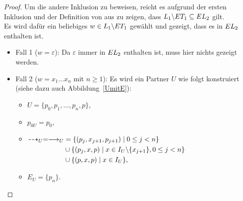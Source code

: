 \begin{proof}
  Um die andere Inklusion zu beweisen, reicht es aufgrund der ersten
  Inklusion und der Definition von \EL{} aus zu zeigen, dass $L_1\backslash ET
  _1\subseteq EL _2$ gilt.\\
  Es wird dafür ein beliebiges $w\in L_1\backslash ET _1$ gewählt und gezeigt,
  dass es in $EL _2$ enthalten ist.
  \begin{itemize}
    \item Fall 1 ($w=\varepsilon$): Da $\varepsilon$ immer in $EL _2$
      enthalten ist, muss hier nichts gezeigt werden.
    \item Fall 2 ($w=x_1\dots x_n$ mit $n\geq 1$): Es wird ein Partner $U$ wie
      folgt konstruiert (siehe dazu auch Abbildung~\ref{UmitE}):
      \begin{itemize}
        \item $U=\{p_0,p_1,\dots ,p_n,p\}$,
        \item $p_{0U}=p_0$,
        \item $\begin{aligned}[t]
            \may _U = \must _U&=\{(p_j,x_{j+1},p_{j+1})\mid 0\leq j< n\}\\
            &\cup\{(p_j,x,p)\mid x\in I_U\backslash\{x_{j+1}\},0\leq j< n\}\\
            &\cup\{(p,x,p)\mid x\in I_U\},
        \end{aligned}$
        \item $E_U=\{p_n\}$.
      \end{itemize}
      \begin{figure} [h!tbp]
      \begin{center}
\end{center}
\end{figure}
\end{itemize}
\end{proof}
